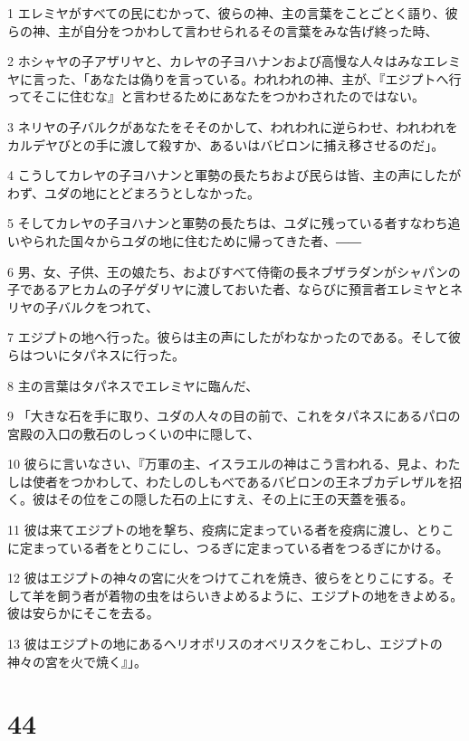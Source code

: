 \par 1 エレミヤがすべての民にむかって、彼らの神、主の言葉をことごとく語り、彼らの神、主が自分をつかわして言わせられるその言葉をみな告げ終った時、
\par 2 ホシャヤの子アザリヤと、カレヤの子ヨハナンおよび高慢な人々はみなエレミヤに言った、「あなたは偽りを言っている。われわれの神、主が、『エジプトへ行ってそこに住むな』と言わせるためにあなたをつかわされたのではない。
\par 3 ネリヤの子バルクがあなたをそそのかして、われわれに逆らわせ、われわれをカルデヤびとの手に渡して殺すか、あるいはバビロンに捕え移させるのだ」。
\par 4 こうしてカレヤの子ヨハナンと軍勢の長たちおよび民らは皆、主の声にしたがわず、ユダの地にとどまろうとしなかった。
\par 5 そしてカレヤの子ヨハナンと軍勢の長たちは、ユダに残っている者すなわち追いやられた国々からユダの地に住むために帰ってきた者、――
\par 6 男、女、子供、王の娘たち、およびすべて侍衛の長ネブザラダンがシャパンの子であるアヒカムの子ゲダリヤに渡しておいた者、ならびに預言者エレミヤとネリヤの子バルクをつれて、
\par 7 エジプトの地へ行った。彼らは主の声にしたがわなかったのである。そして彼らはついにタパネスに行った。
\par 8 主の言葉はタパネスでエレミヤに臨んだ、
\par 9 「大きな石を手に取り、ユダの人々の目の前で、これをタパネスにあるパロの宮殿の入口の敷石のしっくいの中に隠して、
\par 10 彼らに言いなさい、『万軍の主、イスラエルの神はこう言われる、見よ、わたしは使者をつかわして、わたしのしもべであるバビロンの王ネブカデレザルを招く。彼はその位をこの隠した石の上にすえ、その上に王の天蓋を張る。
\par 11 彼は来てエジプトの地を撃ち、疫病に定まっている者を疫病に渡し、とりこに定まっている者をとりこにし、つるぎに定まっている者をつるぎにかける。
\par 12 彼はエジプトの神々の宮に火をつけてこれを焼き、彼らをとりこにする。そして羊を飼う者が着物の虫をはらいきよめるように、エジプトの地をきよめる。彼は安らかにそこを去る。
\par 13 彼はエジプトの地にあるヘリオポリスのオベリスクをこわし、エジプトの神々の宮を火で焼く』」。

\chapter{44}

